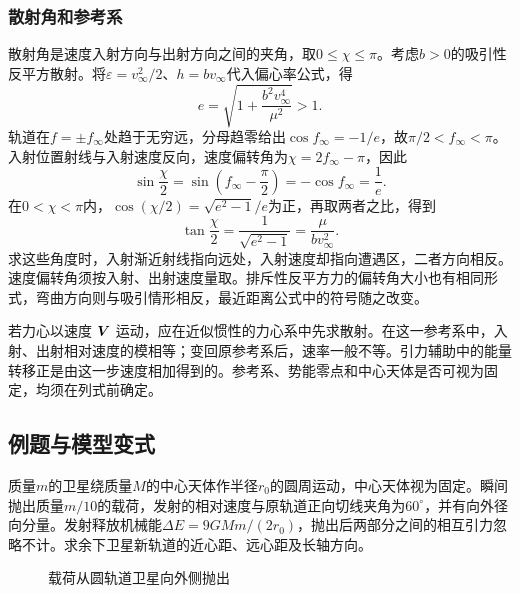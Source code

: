 \subsubsection{散射角和参考系}

散射角是速度入射方向与出射方向之间的夹角，取$0\le\chi\le\pi$。考虑$b>0$的吸引性反平方散射。将$\varepsilon=v_\infty^2/2$、$h=bv_\infty$代入偏心率公式，得
\[
 e=\sqrt{1+\frac{b^2v_\infty^4}{\mu^2}}>1.
\]
轨道在$f=\pm f_\infty$处趋于无穷远，分母趋零给出$\cos f_\infty=-1/e$，故$\pi/2<f_\infty<\pi$。入射位置射线与入射速度反向，速度偏转角为$\chi=2f_\infty-\pi$，因此
\[
 \sin\frac\chi2=\sin\left(f_\infty-\frac\pi2\right)
 =-\cos f_\infty=\frac1e.
\]
在$0<\chi<\pi$内，$\cos(\chi/2)=\sqrt{e^2-1}/e$为正，再取两者之比，得到
\[
 \tan\frac\chi2=\frac1{\sqrt{e^2-1}}
 =\frac{\mu}{bv_\infty^2}.
\]
求这些角度时，入射渐近射线指向远处，入射速度却指向遭遇区，二者方向相反。速度偏转角须按入射、出射速度量取。排斥性反平方力的偏转角大小也有相同形式，弯曲方向则与吸引情形相反，最近距离公式中的符号随之改变。

若力心以速度 $\bm{V}$ 运动，应在近似惯性的力心系中先求散射。在这一参考系中，入射、出射相对速度的模相等；变回原参考系后，速率一般不等。引力辅助中的能量转移正是由这一步速度相加得到的。参考系、势能零点和中心天体是否可视为固定，均须在列式前确定。


\subsection{例题与模型变式}

\begin{example}[圆轨道卫星抛出载荷]\label{ex:hw8-4}

质量$m$的卫星绕质量$M$的中心天体作半径$r_0$的圆周运动，中心天体视为固定。瞬间抛出质量$m/10$的载荷，发射的相对速度与原轨道正向切线夹角为$60^\circ$，并有向外径向分量。发射释放机械能$\Delta E=9GMm/(2r_0)$，抛出后两部分之间的相互引力忽略不计。求余下卫星新轨道的近心距、远心距及长轴方向。

\end{example}


\begin{figure}[H]\centering
{}
\caption{载荷从圆轨道卫星向外侧抛出}\label{fig:hw8-4-q}
\end{figure}

